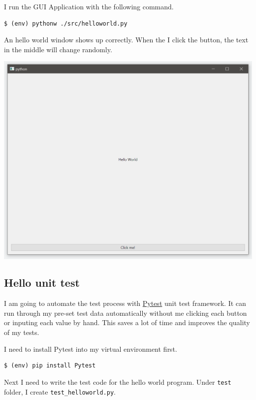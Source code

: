 \documentclass[a4paper]{report}
\begin{document}
\inputminted{python}{../src/helloworld.py}

I run the GUI Application with the following command.

\begin{verbatim}
$ (env) pythonw ./src/helloworld.py
\end{verbatim}

An hello world window shows up correctly. When the I click the  button, the text in the middle will change randomly.

\includegraphics[width=\linewidth]{Hello-World.png}

\subsection{Hello unit test}

I am going to automate the test process with \href{https://docs.pytest.org/}{Pytest} unit test framework. It can run through my pre-set test data automatically without me clicking each button or inputing each value by hand. This saves a lot of time and improves the quality of my tests.

I need to install Pytest into my virtual environment first.

\begin{verbatim}
$ (env) pip install Pytest
\end{verbatim}

Next I need to write the test code for the hello world program. Under \texttt{test} folder, I create \texttt{test_helloworld.py}.
\end{document}
